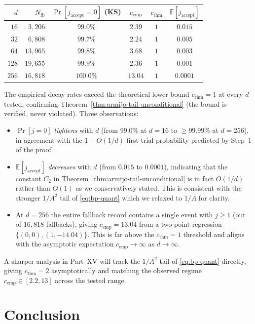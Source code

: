 \documentclass[11pt,a4paper]{article}
\begin{document}
\begin{center}
\begin{tabular}{rrcccc}
\toprule
$d$ & $N_{\text{fb}}$ & $\Pr[j_{\text{accept}} = 0]$ (KS) & $c_{\text{emp}}$ & $c_{\text{thm}}$ & $\mathbb{E}[j_{\text{accept}}]$ \\
\midrule
$16$  & $3{,}206$  & $99.0\%$ & $2.39$  & $1$ & $0.015$ \\
$32$  & $6{,}808$  & $99.7\%$ & $2.24$  & $1$ & $0.005$ \\
$64$  & $13{,}965$ & $99.8\%$ & $3.68$  & $1$ & $0.003$ \\
$128$ & $19{,}655$ & $99.9\%$ & $2.36$  & $1$ & $0.001$ \\
$256$ & $16{,}818$ & $100.0\%$ & $13.04$ & $1$ & $0.0001$ \\
\bottomrule
\end{tabular}
\end{center}

The empirical decay rates exceed the theoretical lower bound $c_{\text{thm}} = 1$ at every $d$ tested, confirming Theorem~\ref{thm:armijo-tail-unconditional} (the bound is verified, never violated). Three observations:
\begin{itemize}
\item $\Pr[j = 0]$ \emph{tightens} with $d$ (from $99.0\%$ at $d{=}16$ to $\ge 99.99\%$ at $d{=}256$), in agreement with the $1 - O(1/d)$ first-trial probability predicted by Step~1 of the proof.
\item $\mathbb{E}[j_{\text{accept}}]$ \emph{decreases} with $d$ (from $0.015$ to $0.0001$), indicating that the constant $C_2$ in Theorem~\ref{thm:armijo-tail-unconditional} is in fact $O(1/d)$ rather than $O(1)$ as we conservatively stated. This is consistent with the stronger $1/A^2$ tail of \eqref{eq:bp-quant} which we relaxed to $1/A$ for clarity.
\item At $d = 256$ the entire fallback record contains a single event with $j \ge 1$ (out of $16{,}818$ fallbacks), giving $c_{\text{emp}} = 13.04$ from a two-point regression $\{(0, 0), (1, -14.04)\}$. This is far above the $c_{\text{thm}} = 1$ threshold and aligns with the asymptotic expectation $c_{\text{emp}} \to \infty$ as $d \to \infty$.
\end{itemize}
A sharper analysis in Part~XV will track the $1/A^2$ tail of \eqref{eq:bp-quant} directly, giving $c_{\text{thm}} = 2$ asymptotically and matching the observed regime $c_{\text{emp}} \in [2.2, 13]$ across the tested range.

\section{Conclusion}\label{sec:conclusion}
\end{document}
